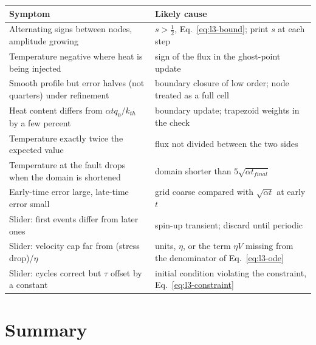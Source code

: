 \begin{center}
\small
\renewcommand{\arraystretch}{1.15}
\begin{tabular}{p{}p{}}
\toprule
Symptom & Likely cause \\
\midrule
Alternating signs between nodes, amplitude growing & $s>\tfrac12$, Eq.~\eqref{eq:l3-bound}; print $s$ at each step \\
Temperature negative where heat is being injected & sign of the flux in the ghost-point update \\
Smooth profile but error halves (not quarters) under refinement & boundary closure of low order; node treated as a full cell \\
Heat content differs from $\alpha t q_0/k_{th}$ by a few percent & boundary update; trapezoid weights in the check \\
Temperature exactly twice the expected value & flux not divided between the two sides \\
Temperature at the fault drops when the domain is shortened & domain shorter than $5\sqrt{\alpha t_{final}}$ \\
Early-time error large, late-time error small & grid coarse compared with $\sqrt{\alpha t}$ at early $t$ \\
Slider: first events differ from later ones & spin-up transient; discard until periodic \\
Slider: velocity cap far from (stress drop)/$\eta$ & units, $\eta$, or the term $\eta V$ missing from the denominator of Eq.~\eqref{eq:l3-ode} \\
Slider: cycles correct but $\tau$ offset by a constant & initial condition violating the constraint, Eq.~\eqref{eq:l3-constraint} \\
\bottomrule
\end{tabular}
\end{center}

\section{Summary}
\label{sec:l3-summary}

